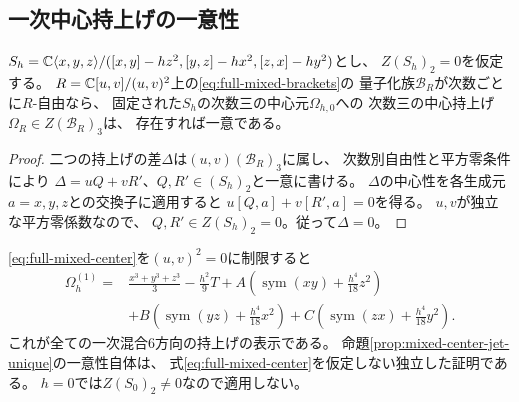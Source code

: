 \subsection{一次中心持上げの一意性}
\begin{proposition}\label{prop:mixed-center-jet-unique}
$S_h=\mathbb C\langle x,y,z\rangle/
([x,y]-hz^2,[y,z]-hx^2,[z,x]-hy^2)$とし、
$Z(S_h)_2=0$を仮定する。
$R=\mathbb C[u,v]/(u,v)^2$上の\eqref{eq:full-mixed-brackets}の
量子化族$\mathcal B_R$が次数ごとに$R$-自由なら、
固定された$S_h$の次数三の中心元$\Omega_{h,0}$への
次数三の中心持上げ$\Omega_R\in Z(\mathcal B_R)_3$は、
存在すれば一意である。
\end{proposition}
\begin{proof}
二つの持上げの差$\Delta$は$(u,v)(\mathcal B_R)_3$に属し、
次数別自由性と平方零条件により
$\Delta=uQ+vR'$、$Q,R'\in(S_h)_2$と一意に書ける。
$\Delta$の中心性を各生成元$a=x,y,z$との交換子に適用すると
$u[Q,a]+v[R',a]=0$を得る。
$u,v$が独立な平方零係数なので、
$Q,R'\in Z(S_h)_2=0$。従って$\Delta=0$。
\end{proof}
\begin{remark}
\eqref{eq:full-mixed-center}を$(u,v)^2=0$に制限すると
\[
\begin{aligned}
 \Omega_h^{(1)}
 ={}&\frac{x^3+y^3+z^3}{3}-\frac{h^2}{9}T
 +A\left(\operatorname{sym}(xy)+\frac{h^4}{18}z^2\right)\\
 &+B\left(\operatorname{sym}(yz)+\frac{h^4}{18}x^2\right)
 +C\left(\operatorname{sym}(zx)+\frac{h^4}{18}y^2\right).
\end{aligned}
\]
これが全ての一次混合6方向の持上げの表示である。
命題\ref{prop:mixed-center-jet-unique}の一意性自体は、
式\eqref{eq:full-mixed-center}を仮定しない独立した証明である。
$h=0$では$Z(S_0)_2\ne0$なので適用しない。
\end{remark}

